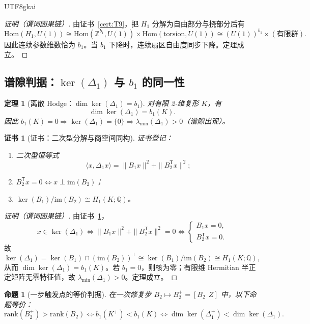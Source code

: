 \documentclass[12pt]{article}
\newtheorem{theorem}{定理}[section]
\newtheorem{proposition}{命题}[section]
\newtheorem{Certificate}{证书}[section]
\newcommand{\QQ}{\mathbb{Q}}
\begin{document}
\begin{CJK*}{UTF8}{gkai}
\begin{proof}[证明（谓词因果链）]
由证书~\ref{cert:T9}，把 $H_1$ 分解为自由部分与挠部分后有
\[
\mathrm{Hom}(H_1,U(1))
\cong
\mathrm{Hom}(\mathbb Z^{b_1},U(1))\times\mathrm{Hom}(\text{torsion},U(1))
\cong
(U(1))^{b_1}\times(\text{有限群}).
\]
因此连续参数维数恰为 $b_1$。当 $b_1$ 下降时，连续扇区自由度同步下降。定理成立。
\end{proof}

\subsection{谱隙判据：$\ker(\Delta_1)$ 与 $b_1$ 的同一性}

\begin{theorem}[离散 Hodge：$\dim\ker(\Delta_1)=b_1$]
\label{thm:T10}
对有限 2-维复形 $K$，有
\[
\dim\ker(\Delta_1)=b_1(K).
\]
因此 $b_1(K)=0\Rightarrow \ker(\Delta_1)=\{0\}\Rightarrow \lambda_{\min}(\Delta_1)>0$（谱隙出现）。
\end{theorem}

\begin{Certificate}[证书：二次型分解与商空间同构]
\label{cert:T10}
证书登记：
\begin{enumerate}
\item 二次型恒等式
\[
\langle x,\Delta_1x\rangle=\|B_1x\|^2+\|B_2^{\mathsf T}x\|^2;
\]
\item $B_2^{\mathsf T}x=0\Leftrightarrow x\perp\mathrm{im}(B_2)$；
\item $\ker(B_1)/\mathrm{im}(B_2)\cong H_1(K;\QQ)$。
\end{enumerate}
\end{Certificate}

\begin{proof}[证明（谓词因果链）]
由证书~\ref{cert:T10}，
\[
x\in\ker(\Delta_1)
\Leftrightarrow
\|B_1x\|^2+\|B_2^{\mathsf T}x\|^2=0
\Leftrightarrow
\begin{cases}
B_1x=0,\\
B_2^{\mathsf T}x=0.
\end{cases}
\]
故
\[
\ker(\Delta_1)=\ker(B_1)\cap(\mathrm{im}(B_2))^\perp
\cong
\ker(B_1)/\mathrm{im}(B_2)
\cong
H_1(K;\QQ),
\]
从而 $\dim\ker(\Delta_1)=b_1(K)$。若 $b_1=0$，则核为零；有限维 Hermitian 半正定矩阵无零特征值，故 $\lambda_{\min}(\Delta_1)>0$。定理成立。
\end{proof}

\begin{proposition}[一步触发点的等价判据]
\label{prop:P2}
在一次修复步 $B_2\mapsto B_2^+=[B_2\ \ Z]$ 中，以下命题等价：
\[
\mathrm{rank}(B_2^+)>\mathrm{rank}(B_2)
\Longleftrightarrow
b_1(K^+)<b_1(K)
\Longleftrightarrow
\dim\ker(\Delta_1^+)<\dim\ker(\Delta_1).
\]
\end{proposition}


\end{CJK*}
\end{document}
